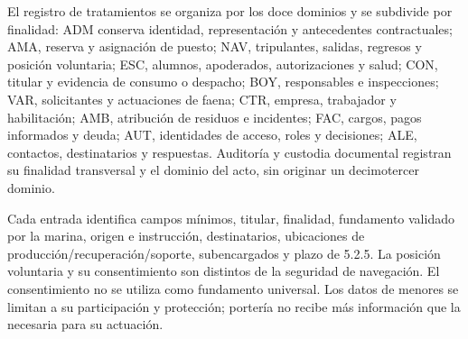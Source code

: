 El registro de tratamientos se organiza por los doce dominios y se subdivide por finalidad: ADM conserva identidad, representación y antecedentes contractuales; AMA, reserva y asignación de puesto; NAV, tripulantes, salidas, regresos y posición voluntaria; ESC, alumnos, apoderados, autorizaciones y salud; CON, titular y evidencia de consumo o despacho; BOY, responsables e inspecciones; VAR, solicitantes y actuaciones de faena; CTR, empresa, trabajador y habilitación; AMB, atribución de residuos e incidentes; FAC, cargos, pagos informados y deuda; AUT, identidades de acceso, roles y decisiones; ALE, contactos, destinatarios y respuestas. Auditoría y custodia documental registran su finalidad transversal y el dominio del acto, sin originar un decimotercer dominio.

Cada entrada identifica campos mínimos, titular, finalidad, fundamento validado por la marina, origen e instrucción, destinatarios, ubicaciones de producción/recuperación/soporte, subencargados y plazo de 5.2.5. La posición voluntaria y su consentimiento son distintos de la seguridad de navegación. El consentimiento no se utiliza como fundamento universal. Los datos de menores se limitan a su participación y protección; portería no recibe más información que la necesaria para su actuación.

